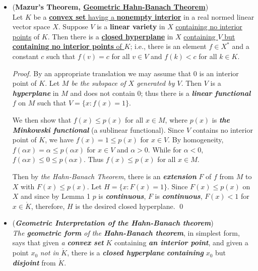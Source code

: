 \documentclass[11pt]{article}
\begin{document}
\begin{itemize}
\item \begin{theorem} (\textbf{Mazur's Theorem, \underline{Geometric Hahn-Banach Theorem}}) \citep{luenberger1997optimization}\\
Let $K$ be a \underline{\textbf{convex set} having a \textbf{nonempty interior}} in a real normed linear vector space $X$. Suppose $V$ is a \textbf{linear variety} in $X$ \underline{containing no interior points} of $K$. Then there is a \underline{\textbf{closed hyperplane}} in $X$ \underline{containing $V$ but \textbf{containing no interior points} of $K$}; i.e., there is an element $f \in X^{*}$ and a constant $c$ such that $f(v) = c$ for all $v \in V$ and $f(k) < c$ for all $k \in K$.
\end{theorem}
\begin{proof}
By an appropriate translation we may assume that $0$ is an interior point of $K$. Let \emph{$M$ be the subspace of $X$ generated by $V$}. Then $V$ is a \emph{\textbf{hyperplane}} in $M$ and does not contain $0$; thus there is a \emph{\textbf{linear functional}} $f$ on $M$ such that $V = \{x :f(x) = 1\}$.

We then show that $f(x) \le p(x)$ for all $x \in M$, where $p(x)$ is \emph{\textbf{the Minkowski functional}} (a sublinear functional). Since $V$ contains no interior
point of $K$, we have $f(x) = 1 \le  p(x)$ for $x \in V$. By homogeneity, $f(\alpha x) = \alpha \le p(\alpha x)$ for $x \in V$ and $\alpha > 0$. While for $\alpha < 0$, $f(\alpha x) \le 0 \le p(\alpha x)$. Thus $f(x) \le p(x)$ for all $x \in M$.

Then by \emph{the Hahn-Banach Theorem}, there is an \emph{\textbf{extension}} $F$ of $f$ from $M$ to $X$ with $F(x) \le p(x)$. Let $H= \{x: F(x) = 1\}$. Since $F(x) \le p(x)$ on $X$ and since by Lemma 1 $p$ is \emph{\textbf{continuous}}, $F$ is \emph{\textbf{continuous}}, $F(x) < 1$ for $x \in \mathring{K}$, therefore, $H$ is the desired closed hyperplane. \qed
\end{proof}


\item \begin{remark} (\emph{\textbf{Geometric Interpretation of the Hahn-Banach theorem}})\\
\emph{The \textbf{geometric form} of the \textbf{Hahn-Banach theorem}}, in simplest form, says that given \emph{a \textbf{convex set}} $K$ containing \emph{\textbf{an interior point}}, and given a point $x_0$ \emph{not in} $\mathring{K}$, there is a \emph{\textbf{closed hyperplane}} \emph{\textbf{containing}} $x_0$ but \emph{\textbf{disjoint}} from $\mathring{K}$.
\end{remark}




\end{itemize}
\end{document}
